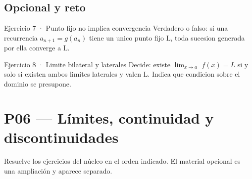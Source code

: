 \documentclass[10pt,a4paper,oneside,openany]{book}
\begin{document}
\section*{Opcional y reto}
\begin{PSevenOptionalFixed}{Ejercicio 7 · Punto fijo no implica convergencia}
Verdadero o falso: si una recurrencia \(a_{n+1}=g(a_n)\) tiene un unico punto fijo L, toda sucesion generada por ella converge a L.
\end{PSevenOptionalFixed}
\begin{PSevenOptionalFixed}{Ejercicio 8 · Limite bilateral y laterales}
Decide: existe \(\lim_{x\to a}\) \(f(x)=L\) si y solo si existen ambos limites laterales y valen L. Indica que condicion sobre el dominio se presupone.
\end{PSevenOptionalFixed}
\chapter{P06 — Límites, continuidad y discontinuidades}
Resuelve los ejercicios del núcleo en el orden indicado. El material opcional es una ampliación y aparece separado.
\end{document}
